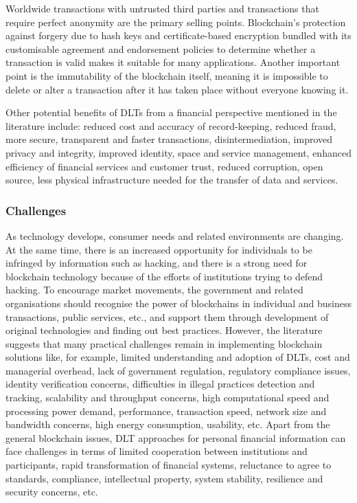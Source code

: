 Worldwide transactions with untrusted third parties and transactions that require perfect anonymity are the primary selling points. Blockchain’s protection against forgery due to hash keys and certificate-based encryption bundled with its customisable agreement and endorsement policies to determine whether a transaction is valid makes it suitable for many applications. Another important point is the immutability of the blockchain itself, meaning it is impossible to delete or alter a transaction after it has taken place without everyone knowing it.

Other potential benefits of DLTs from a financial perspective mentioned in the literature \cite{fosso2020bitcoin} include: reduced cost and accuracy of record-keeping, reduced fraud, more secure, transparent and faster transactions, disintermediation, improved privacy and integrity, improved identity, space and service management, enhanced efficiency of financial services and customer trust, reduced corruption, open source, less physical infrastructure needed for the transfer of data and services.

\subsubsection{Challenges}
\label{sssec:f-challenges}

As technology develops, consumer needs and related environments are changing. At the same time, there is an increased opportunity for individuals to be infringed by information such as hacking, and there is a strong need for blockchain technology because of the efforts of institutions trying to defend hacking. To encourage market movements, the government and related organisations should recognise the power of blockchains in individual and business transactions, public services, etc., and support them through development of original technologies and finding out best practices. However, the literature \cite{fosso2020bitcoin} suggests that many practical challenges remain in implementing blockchain solutions like, for example, limited understanding and adoption of DLTs, cost and managerial overhead, lack of government regulation, regulatory compliance issues, identity verification concerns, difficulties in illegal practices detection and tracking, scalability and throughput concerns, high computational speed and processing power demand, performance, transaction speed, network size and bandwidth concerns, high energy consumption, usability, etc. Apart from the general blockchain issues, DLT approaches for personal financial information can face challenges in terms of limited cooperation between institutions and participants, rapid transformation of financial systems, reluctance to agree to standards, compliance, intellectual property, system stability, resilience and security concerns, etc. 

